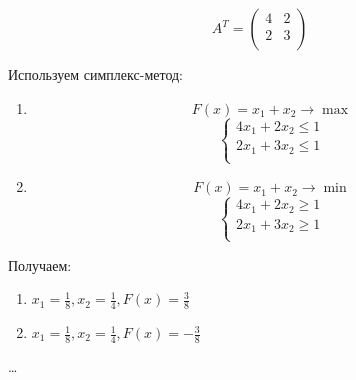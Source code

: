 \documentclass[11pt, a4paper]{article}
\begin{document}
    \begin{equation}
        A^T =
        \begin{pmatrix}
            4 & 2 \\
            2 & 3 \\
        \end{pmatrix}\label{eq:equation21}
    \end{equation}

    Используем симплекс-метод:
    \begin{enumerate}
        \item
        \begin{equation}
            F(x) = x_1 + x_2 \rightarrow \max\label{eq:equation22}
        \end{equation}
        \begin{equation}
            \begin{cases}
                4x_1 + 2x_2 \leqslant 1\\
                2x_1 + 3x_2 \leqslant 1\\
            \end{cases}\label{eq:equation23}
        \end{equation}

        \item
        \begin{equation}
            F(x) = x_1 + x_2 \rightarrow \min\label{eq:equation24}
        \end{equation}
        \begin{equation}
            \begin{cases}
                4x_1 + 2x_2 \geqslant 1\\
                2x_1 + 3x_2 \geqslant 1\\
            \end{cases}\label{eq:equation25}
        \end{equation}
    \end{enumerate}

    Получаем:

    \begin{enumerate}
        \item $x_1 = \frac{1}{8}, x_2 = \frac{1}{4}, F(x) = \frac{3}{8}$
        \item $x_1 = \frac{1}{8}, x_2 = \frac{1}{4}, F(x) = -\frac{3}{8}$
    \end{enumerate}

    \dots

    \newpage
\end{document}
